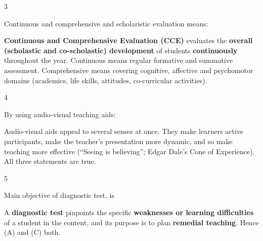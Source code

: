 \begin{question}{3}
{Continuous and comprehensive and scholaristic evaluation means:\par}
\begin{explain}
\textbf{Continuous and Comprehensive Evaluation (CCE)} evaluates the \textbf{overall (scholastic and co-scholastic) development} of students \textbf{continuously} throughout the year. Continuous means regular formative and summative assessment. Comprehensive means covering cognitive, affective and psychomotor domains (academics, life skills, attitudes, co-curricular activities).
\end{explain}
\end{question}

\begin{question}{4}
{By using audio-visual teaching aids:\par}
\begin{explain}
Audio-visual aids appeal to several senses at once. They make learners active participants, make the teacher's presentation more dynamic, and so make teaching more effective (``Seeing is believing''; Edgar Dale's Cone of Experience). All three statements are true.
\end{explain}
\end{question}

\begin{question}{5}
{Main objective of diagnostic test, is \blank{}\par}
\begin{explain}
A \textbf{diagnostic test} pinpoints the specific \textbf{weaknesses or learning difficulties} of a student in the content, and its purpose is to plan \textbf{remedial teaching}. Hence (A) and (C) both.
\end{explain}
\end{question}

